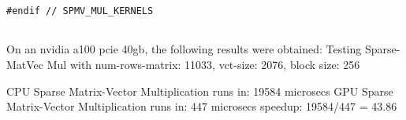 \documentclass{article}
\begin{document}
\begin{itemize}
\begin{lstlisting}[language=cuda]
    #endif // SPMV_MUL_KERNELS


  \end{lstlisting}

  On an nvidia a100 pcie 40gb, the following results were obtained:
  Testing Sparse-MatVec Mul with num-rows-matrix: 11033, vct-size: 2076, block size: 256

  CPU Sparse Matrix-Vector Multiplication runs in: 19584 microsecs
  GPU Sparse Matrix-Vector Multiplication runs in: 447 microsecs
  speedup: 19584/447 = 43.86
\end{itemize}
\end{document}
